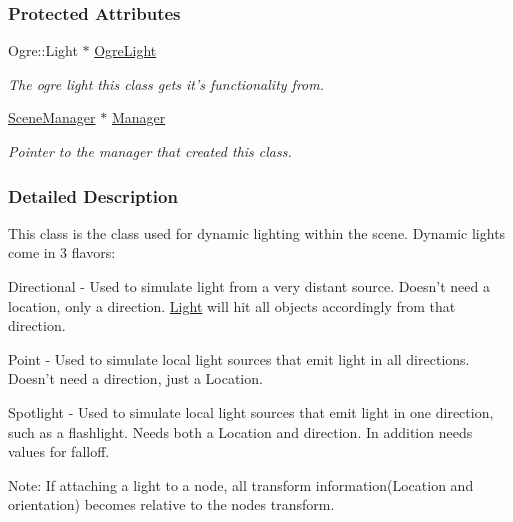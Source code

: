 \subsubsection*{Protected Attributes}
\begin{DoxyCompactItemize}
\item 
\hypertarget{classphys_1_1Light_a20fc9136847907955cfb8c1a47d6ec6a}{
Ogre::Light $\ast$ \hyperlink{classphys_1_1Light_a20fc9136847907955cfb8c1a47d6ec6a}{OgreLight}}
\label{classphys_1_1Light_a20fc9136847907955cfb8c1a47d6ec6a}

\begin{DoxyCompactList}\small\item\em The ogre light this class gets it's functionality from. \item\end{DoxyCompactList}\item 
\hypertarget{classphys_1_1Light_a2633fc1795d2a3e2ddddc71674a7eb84}{
\hyperlink{classphys_1_1SceneManager}{SceneManager} $\ast$ \hyperlink{classphys_1_1Light_a2633fc1795d2a3e2ddddc71674a7eb84}{Manager}}
\label{classphys_1_1Light_a2633fc1795d2a3e2ddddc71674a7eb84}

\begin{DoxyCompactList}\small\item\em Pointer to the manager that created this class. \item\end{DoxyCompactList}\end{DoxyCompactItemize}


\subsubsection{Detailed Description}
This class is the class used for dynamic lighting within the scene. Dynamic lights come in 3 flavors: \par
 Directional -\/ Used to simulate light from a very distant source. Doesn't need a location, only a direction. \hyperlink{classphys_1_1Light}{Light} will hit all objects accordingly from that direction. \par
 Point -\/ Used to simulate local light sources that emit light in all directions. Doesn't need a direction, just a Location. \par
 Spotlight -\/ Used to simulate local light sources that emit light in one direction, such as a flashlight. Needs both a Location and direction. In addition needs values for falloff. \par
 Note: If attaching a light to a node, all transform information(Location and orientation) becomes relative to the nodes transform. 

